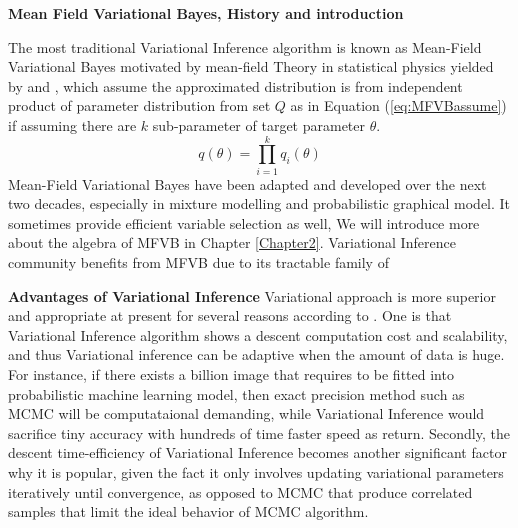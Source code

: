 \textbf{Mean Field Variational Bayes, History and introduction}

The most traditional Variational Inference algorithm is known as Mean-Field Variational Bayes motivated by mean-field Theory in statistical physics yielded by 
\cite{jordan_ghahramani_jaakkola_saul_1998} and \cite{attias_1999}, which assume the approximated distribution is from independent product of parameter distribution from set $Q$ as in Equation (\ref{eq:MFVBassume}) if assuming there are $k$ sub-parameter of target parameter $\theta$.
\begin{equation}
	\label{eq:MFVBassume}
	q(\theta) = \prod_{i=1}^{k} q_i(\theta)
\end{equation}
Mean-Field Variational Bayes have been adapted and developed over the next two decades, especially in mixture modelling and probabilistic graphical model. It sometimes provide efficient variable selection as well, We will introduce more about the algebra of MFVB in Chapter \ref{Chapter2}. Variational Inference community benefits from MFVB due to its tractable family of 

\textbf{Advantages of Variational Inference}
Variational approach is more superior and appropriate at present for several reasons according to \cite{blei_kucukelbir_mcauliffe_2017}. One is that Variational Inference algorithm shows a descent computation cost and scalability, and thus Variational inference can be adaptive when the amount of data is huge. For instance, if there exists a billion image that requires to be fitted into probabilistic machine learning model, then exact precision method such as MCMC will be computataional demanding, while Variational Inference would sacrifice tiny accuracy with hundreds of time faster speed as return.
Secondly, the descent time-efficiency of Variational Inference becomes another significant factor why it is popular, given the fact it only involves updating variational parameters iteratively until convergence, as opposed to MCMC that produce correlated samples that limit the ideal behavior of MCMC algorithm.


